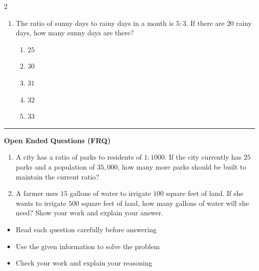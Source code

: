 \documentclass[10pt]{article}
\begin{document}
\begin{multicols}{2}
\begin{enumerate}[label=\textbf{Q\arabic*.}, leftmargin=*, itemsep=6pt, parsep=0pt]
  \item \small The ratio of sunny days to rainy days in a month is $5:3$. If there are $20$ rainy days, how many sunny days are there?
  \begin{enumerate}[label=(\Alph*), leftmargin=0.6cm, nosep, itemsep=2pt]
    \item $25$
    \item $30$
    \item $31$
    \item $32$
    \item $33$
  \end{enumerate}

\end{enumerate}
\end{multicols}

\vspace{-0.2cm}
\hrule
\vspace{0.2cm}
\textbf{\small Open Ended Questions (FRQ)}
\begin{enumerate}[label=\textbf{Q\arabic*.}, start=9, itemsep=5pt, topsep=0pt]

  \item \small A city has a ratio of parks to residents of $1:1000$. If the city currently has $25$ parks and a population of $35,000$, how many more parks should be built to maintain the current ratio? \vspace{2cm}

  \item \small A farmer uses $15$ gallons of water to irrigate $100$ square feet of land. If she wants to irrigate $500$ square feet of land, how many gallons of water will she need? Show your work and explain your answer. \vspace{2cm}

\end{enumerate}

\vfill

\begin{tcolorbox}[colback=blue!5, colframe=mainblue!50, title=\small \textbf{Chef's Tips}, fonttitle=\bfseries, bottom=1mm]
\begin{itemize}[noitemsep, topsep=2pt, leftmargin=0.5cm]
  \item \scriptsize Read each question carefully before answering\item \scriptsize Use the given information to solve the problem\item \scriptsize Check your work and explain your reasoning
\end{itemize}
\end{tcolorbox}
\end{document}
